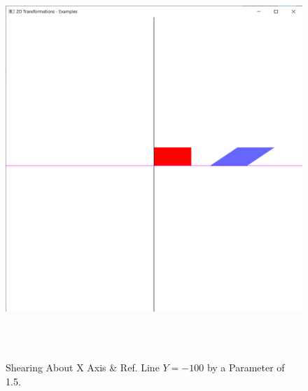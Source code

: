 \documentclass[12pt, a4]{article}
\begin{document}
\subsection*{}
\begin{figure}[h]
\centering
\caption{Shearing About X Axis \& Ref. Line $Y = -100$ by a Parameter of 1.5.}
\includegraphics[height=15cm, width=15cm]{Outputs/Output-14.png}
\end{figure}

\newpage
\end{document}
